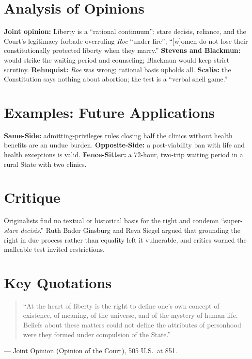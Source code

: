 \documentclass[12pt]{article}
\begin{document}
\section{Analysis of Opinions}
\textbf{Joint opinion:} Liberty is a ``rational continuum''; stare decisis, reliance, and the Court's legitimacy forbade overruling \textit{Roe} ``under fire''; ``[w]omen do not lose their constitutionally protected liberty when they marry.'' \textbf{Stevens and Blackmun:} would strike the waiting period and counseling; Blackmun would keep strict scrutiny. \textbf{Rehnquist:} \textit{Roe} was wrong; rational basis upholds all. \textbf{Scalia:} the Constitution says nothing about abortion; the test is a ``verbal shell game.''

\section{Examples: Future Applications}
\textbf{Same-Side:} admitting-privileges rules closing half the clinics without health benefits are an undue burden. \textbf{Opposite-Side:} a post-viability ban with life and health exceptions is valid. \textbf{Fence-Sitter:} a 72-hour, two-trip waiting period in a rural State with two clinics.

\section{Critique}
Originalists find no textual or historical basis for the right and condemn ``super-\textit{stare decisis}.'' Ruth Bader Ginsburg and Reva Siegel argued that grounding the right in due process rather than equality left it vulnerable, and critics warned the malleable test invited restrictions.

\section{Key Quotations}
\begin{quote}
``At the heart of liberty is the right to define one's own concept of existence, of meaning, of the universe, and of the mystery of human life. Beliefs about these matters could not define the attributes of personhood were they formed under compulsion of the State.''
\end{quote}
\noindent --- Joint Opinion (Opinion of the Court), 505 U.S.\ at 851.
\end{document}
